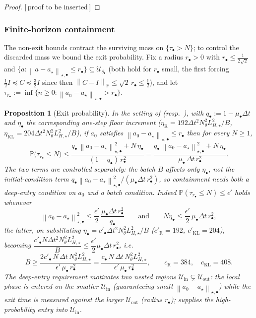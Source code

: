 \documentclass[11pt]{article}
\theoremstyle{plain}
\newtheorem{proposition}[proposition]{Proposition}
\theoremstyle{definition}
\theoremstyle{remark}
\newcommand{\Prob}{\mathbb{P}}
\newcommand{\KL}{\mathrm{KL}}
\newcommand{\Id}{I}
\newcommand{\Frob}{\mathrm{F}}
\newcommand{\Riem}{\mathrm{R}}
\newcommand{\norm}[1]{\left\lVert #1\right\rVert}
\newcommand{\Ureg}{\mathcal{U}}
\newcommand{\LHs}{L_{H,\star}}
\newcommand{\PROOFHOLE}{{\color{red}\textsf{[\,proof to be inserted\,]}}}
\begin{document}
\begin{proof}
\PROOFHOLE
\end{proof}

\subsubsection{Finite-horizon containment}
\label{subsec:finite-horizon}

The non-exit bounds contract the surviving mass on $\{\tau_\bullet>N\}$; to control the discarded mass
we bound the exit probability. Fix a radius $r_\bullet>0$ with $r_\bullet\leq\tfrac1{2\sqrt2}$ and
$\{a:\norm{a-a_\star}_{\star,\bullet}\leq r_\bullet\}\subseteq\Ureg_{\delta_\bullet}$ (both hold for
$r_\bullet$ small, the first forcing $\tfrac12\Id\preceq C\preceq\tfrac32\Id$ since then
$\norm{C-\Id}_{\Frob}\leq\sqrt2\,r_\bullet\leq\tfrac12$), and let
$\tau_{r_\bullet}:=\inf\{n\geq0:\norm{a_n-a_\star}_{\star,\bullet}>r_\bullet\}$.

\begin{proposition}[Exit probability]
\label{prop:finite-horizon}
In the setting of  (resp.\ ), with
$q_\bullet:=1-\mu_\bullet\Delta t$ and $\eta_\bullet$ the corresponding one-step floor increment
($\eta_{\Riem}=192\Delta t^2N_\theta^2\LHs^2/B$, $\eta_{\KL}=204\Delta t^2N_\theta^2\LHs^2/B$), if
$a_0$ satisfies $\norm{a_0-a_\star}_{\star,\bullet}\leq r_\bullet$ then for every $N\geq1$,
\[
    \Prob\bigl(\tau_{r_\bullet}\leq N\bigr)
    \leq\frac{q_\bullet\,\norm{a_0-a_\star}_{\star,\bullet}^2+N\,\eta_\bullet}{(1-q_\bullet)\,r_\bullet^2}
    =\frac{q_\bullet\,\norm{a_0-a_\star}_{\star,\bullet}^2+N\,\eta_\bullet}{\mu_\bullet\,\Delta t\,r_\bullet^2}.
\]
The two terms are controlled separately: the batch $B$ affects only $\eta_\bullet$, not the
initial-condition term $q_\bullet\norm{a_0-a_\star}_{\star,\bullet}^2/(\mu_\bullet\Delta t\,r_\bullet^2)$,
so containment needs both a \emph{deep-entry} condition on $a_0$ and a batch condition. Indeed
$\Prob(\tau_{r_\bullet}\leq N)\leq\epsilon'$ holds whenever
\[
    \norm{a_0-a_\star}_{\star,\bullet}^2\leq\frac{\epsilon'}2\,\frac{\mu_\bullet\Delta t\,r_\bullet^2}{q_\bullet}
    \qquad\text{and}\qquad
    N\eta_\bullet\leq\frac{\epsilon'}2\,\mu_\bullet\Delta t\,r_\bullet^2,
\]
the latter, on substituting $\eta_\bullet=c'_\bullet\Delta t^2N_\theta^2\LHs^2/B$ ($c'_{\Riem}=192$,
$c'_{\KL}=204$), becoming
$\dfrac{c'_\bullet N\Delta t^2N_\theta^2\LHs^2}{B}\leq\dfrac{\epsilon'}2\mu_\bullet\Delta t\,r_\bullet^2$,
i.e.\
\[
    B\geq\frac{2c'_\bullet\,N\,\Delta t\,N_\theta^2\LHs^2}{\epsilon'\,\mu_\bullet\,r_\bullet^2}
    =\frac{c_\bullet\,N\,\Delta t\,N_\theta^2\LHs^2}{\epsilon'\,\mu_\bullet\,r_\bullet^2},
    \qquad c_{\Riem}=384,\quad c_{\KL}=408.
\]
The deep-entry requirement motivates two nested regions
$\mathcal U_{\mathrm{in}}\subsetneq\mathcal U_{\mathrm{out}}$: the local phase is entered on the smaller
$\mathcal U_{\mathrm{in}}$ (guaranteeing small $\norm{a_0-a_\star}_{\star,\bullet}$) while the exit time
is measured against the larger $\mathcal U_{\mathrm{out}}$ (radius $r_\bullet$); 
supplies the high-probability entry into $\mathcal U_{\mathrm{in}}$.
\end{proposition}
\end{document}
